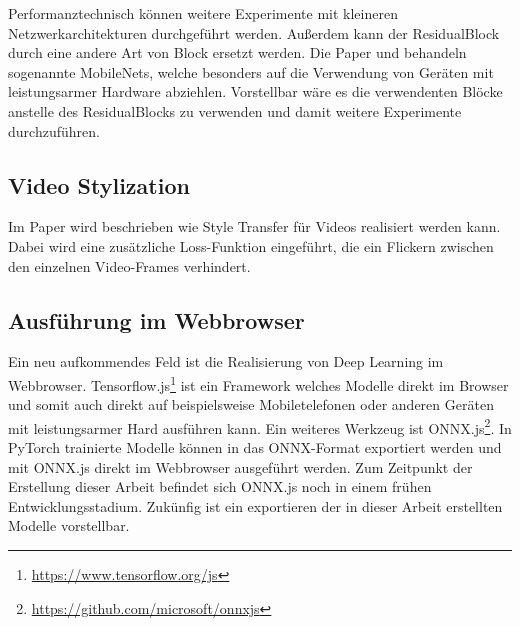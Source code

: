 Performanztechnisch können weitere Experimente mit kleineren Netzwerkarchitekturen durchgeführt werden. Außerdem kann der ResidualBlock durch eine andere Art von Block ersetzt werden. Die Paper \cite{DBLP:journals/corr/HowardZCKWWAA17} und \cite{DBLP:journals/corr/abs-1801-04381} behandeln sogenannte MobileNets, welche besonders auf die Verwendung von Geräten mit leistungsarmer Hardware abziehlen. Vorstellbar wäre es die verwendenten Blöcke anstelle des ResidualBlocks zu verwenden und damit weitere Experimente durchzuführen.

\subsection{Video Stylization}
\label{sec:video_stylization}

Im Paper \cite{DBLP:journals/corr/abs-1807-01197} wird beschrieben wie Style Transfer für Videos realisiert werden kann. Dabei wird eine zusätzliche Loss-Funktion eingeführt, die ein Flickern zwischen den einzelnen Video-Frames verhindert.

\subsection{Ausführung im Webbrowser}
\label{sec:inference_in_browser}

Ein neu aufkommendes Feld ist die Realisierung von Deep Learning im Webbrowser. Tensorflow.js\footnote{\url{https://www.tensorflow.org/js}} ist ein Framework welches Modelle direkt im Browser und somit auch direkt auf beispielsweise Mobiletelefonen oder anderen Geräten mit leistungsarmer Hard ausführen kann. Ein weiteres Werkzeug ist ONNX.js\footnote{\url{https://github.com/microsoft/onnxjs}}. In PyTorch trainierte Modelle können in das ONNX-Format exportiert werden und mit ONNX.js direkt im Webbrowser ausgeführt werden. Zum Zeitpunkt der Erstellung dieser Arbeit befindet sich ONNX.js noch in einem frühen Entwicklungsstadium. Zukünfig ist ein exportieren der in dieser Arbeit erstellten Modelle vorstellbar.